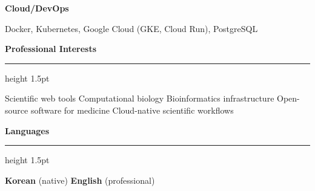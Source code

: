 \documentclass[11pt,a4paper]{article}
\newcommand{\cvsection}[1]{%
  \vspace{1em}
  {\color{sectioncolor}\Large\bfseries #1}
  \vspace{0.2em}
  {\color{sectioncolor}\hrule height 1.5pt}
  \vspace{0.5em}
}
\begin{document}
\vspace{0.3em}
\noindent
\begin{minipage}[t]{3.5cm}
\textbf{\color{accentcolor}Cloud/DevOps}
\end{minipage}%
\begin{minipage}[t]{12cm}
Docker, Kubernetes, Google Cloud (GKE, Cloud Run), PostgreSQL
\end{minipage}

\cvsection{Professional Interests}
Scientific web tools \textbullet\; Computational biology \textbullet\; Bioinformatics infrastructure \textbullet\; Open-source software for medicine \textbullet\; Cloud-native scientific workflows

\cvsection{Languages}
\textbf{Korean} (native) \quad\textbullet\quad \textbf{English} (professional)
\end{document}

